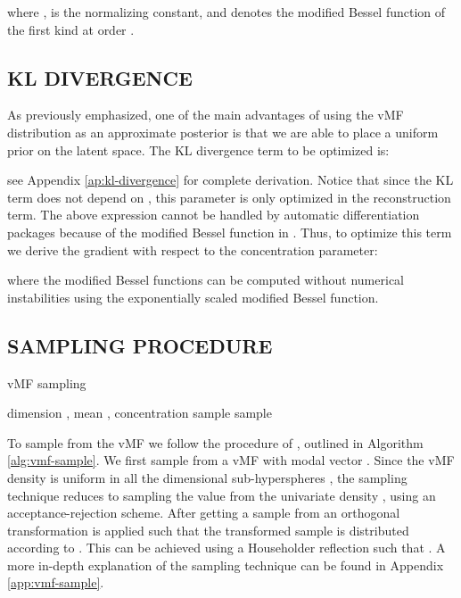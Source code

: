 \documentclass[letterpaper]{article}
\begin{document}
where ,  is the normalizing constant, and  denotes the modified Bessel function of the first kind at order .

\subsection{KL DIVERGENCE} \label{subsec:kl}
As previously emphasized, one of the main advantages of using the vMF distribution as an approximate posterior is that we are able to place a uniform prior on the latent space. The KL divergence term  to be optimized is: 

see Appendix \ref{ap:kl-divergence} for complete derivation. Notice that since the KL term does not depend on , this parameter is only optimized in the reconstruction term. The above expression cannot be handled by automatic differentiation packages because of the modified Bessel function in . Thus, to optimize this term we derive the gradient with respect to the concentration parameter:

where the modified Bessel functions can be computed without numerical instabilities using the exponentially scaled modified Bessel function.

\subsection{SAMPLING PROCEDURE}\label{sec:sampling}

\begin{algorithm}[tb]\label{sampling-vmf}
   \caption{vMF sampling}
   \label{alg:vmf-sample}
\begin{algorithmic}
     dimension , mean , concentration 
    \STATE sample 
    \STATE sample  
    \STATE 
    \STATE  {}
\end{algorithmic}
\end{algorithm}

To sample from the vMF we follow the procedure of \citet{sample-vmf}, outlined in Algorithm \ref{alg:vmf-sample}. We first sample from a vMF  with modal vector . Since the vMF density is uniform in all the  dimensional sub-hyperspheres , the sampling technique reduces to sampling the value  from the univariate density , using an acceptance-rejection scheme. After getting a sample from    an orthogonal transformation  is applied such that the transformed sample is distributed according to .
This can be achieved using a Householder reflection such that . A more in-depth explanation of the sampling technique can be found in Appendix \ref{app:vmf-sample}. 
\end{document}
